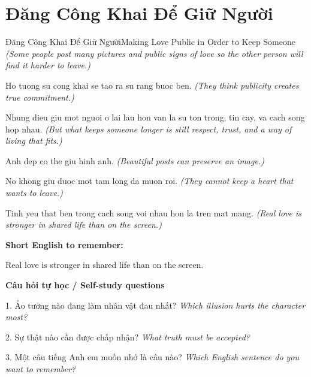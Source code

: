 \section{Đăng Công Khai Để Giữ Người}
\begin{truyen}{Đăng Công Khai Để Giữ Người}{Making Love Public in Order to Keep Someone}
\textit{(Some people post many pictures and public signs of love so the other person will find it harder to leave.)}

Ho tuong su cong khai se tao ra su rang buoc ben.
\textit{(They think publicity creates true commitment.)}

Nhung dieu giu mot nguoi o lai lau hon van la su ton trong, tin cay, va cach song hop nhau.
\textit{(But what keeps someone longer is still respect, trust, and a way of living that fits.)}

Anh dep co the giu hinh anh.
\textit{(Beautiful posts can preserve an image.)}

No khong giu duoc mot tam long da muon roi.
\textit{(They cannot keep a heart that wants to leave.)}

\end{truyen}

\begin{baihoc}
Tinh yeu that ben trong cach song voi nhau hon la tren mat mang.
\textit{(Real love is stronger in shared life than on the screen.)}
\end{baihoc}

\begin{ghinhoanh}
\textbf{Short English to remember:}

Real love is stronger in shared life than on the screen.

\end{ghinhoanh}

\begin{tuhocnhanh}
\textbf{Câu hỏi tự học / Self-study questions}

1. Ảo tưởng nào đang làm nhân vật đau nhất? \textit{Which illusion hurts the character most?}

2. Sự thật nào cần được chấp nhận? \textit{What truth must be accepted?}

3. Một câu tiếng Anh em muốn nhớ là câu nào? \textit{Which English sentence do you want to remember?}
\end{tuhocnhanh}
\ngancach

